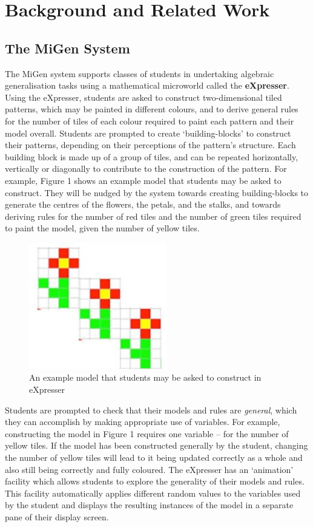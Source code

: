 
\section{Background and Related Work}
\label{sec:backgr-relat-work}


\subsection{The MiGen System}
\label{sec:migen-system}

The MiGen system supports classes of students in undertaking algebraic
generalisation tasks using a mathematical microworld called the 
{\bf eXpresser}. Using the eXpresser, students are asked to construct
two-dimensional tiled patterns, which may be painted in different
colours, and to derive general rules for the number of tiles of each
colour required to paint each pattern and their model
overall. Students are prompted to create `building-blocks' to
construct their patterns, depending on their perceptions of the
pattern’s structure. Each building block is made up of a group of
tiles, and can be repeated horizontally, vertically or diagonally to
contribute to the construction of the pattern. For example, Figure 1
shows an example model that students may be asked to construct. They
will be nudged by the system towards creating building-blocks to
generate the centres of the flowers, the petals, and the stalks, and
towards deriving rules for the number of red tiles and the number of
green tiles required to paint the model, given the number of yellow
tiles.

\begin{figure}[htbp]
  \centering
  \includegraphics[width=6cm]{gfx/example.eps}
  \caption{An example model that students may be asked to construct in eXpresser}
  \label{fig:example}
\end{figure}


Students are prompted to check that their models and rules are {\em
  general}, which they can accomplish by making appropriate use of
variables. For example, constructing the model in Figure 1 requires
one variable – for the number of yellow tiles. If the model has been
constructed generally by the student, changing the number of yellow
tiles will lead to it being updated correctly as a whole and also
still being correctly and fully coloured. The eXpresser has an
`animation' facility which allows students to explore the generality
of their models and rules. This facility automatically applies
different random values to the variables used by the student and
displays the resulting instances of the model in a separate pane of
their display screen.  

